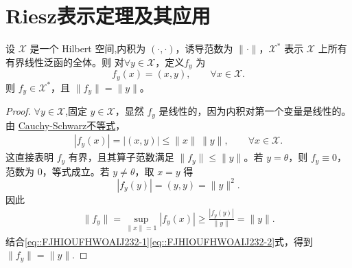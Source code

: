 \documentclass[../../main.tex]{subfiles}%
\begin{document}
\section{Riesz表示定理及其应用}

\begin{theorem}[Riesz表示定理]\label{theorem:Riesz表示定理-泛函}
设 $\mathscr{X}$ 是一个 Hilbert 空间,内积为 $(\cdot,\cdot)$，诱导范数为 $\|\cdot\|$，$\mathscr{X}^*$ 表示 $\mathscr{X}$ 上所有有界线性泛函的全体。则
对$\forall y\in\mathscr{X}$，定义$f_y$ 为
\[
f_y(x) = (x,y), \qquad \forall x\in\mathscr{X}.
\]
则 $f_y\in\mathscr{X}^*$，且 $\|f_y\| = \|y\|$。
\end{theorem}
\begin{proof}
$\forall y\in \mathscr{X}$,固定 $y\in\mathscr{X}$，显然 $f_y$ 是线性的，因为内积对第一个变量是线性的。由 \hyperref[theorem:泛函分析--Cauchy-Schwarz不等式]{Cauchy-Schwarz不等式}，
\begin{align}
|f_y(x)| = |(x,y)| \leqslant \|x\|\,\|y\|, \qquad \forall x\in\mathscr{X}.\label{eq::FJHIOUFHWOAIJ232-1}
\end{align}
这直接表明 $f_y$ 有界，且其算子范数满足 $\|f_y\| \leqslant \|y\|$。若 $y=\theta$，则 $f_y\equiv 0$，范数为 $0$，等式成立。若 $y\neq\theta$，取 $x=y$ 得
\[
|f_y(y)| = (y,y) = \|y\|^2.
\]
因此
\begin{align}
\|f_y\| = \sup_{\|x\|=1}|f_y(x)| \geqslant \frac{|f_y(y)|}{\|y\|} = \|y\|.\label{eq::FJHIOUFHWOAIJ232-2}
\end{align}
结合\eqref{eq::FJHIOUFHWOAIJ232-1}\eqref{eq::FJHIOUFHWOAIJ232-2}式，得到 $\|f_y\| = \|y\|$.
\end{proof}
\end{document}
